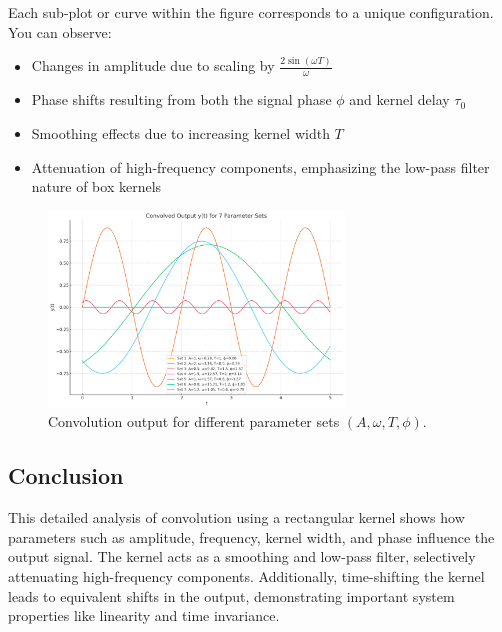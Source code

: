 Each sub-plot or curve within the figure corresponds to a unique configuration. You can observe:
\begin{itemize}
    \item Changes in amplitude due to scaling by \( \frac{2\sin(\omega T)}{\omega} \)
    \item Phase shifts resulting from both the signal phase \( \phi \) and kernel delay \( \tau_0 \)
    \item Smoothing effects due to increasing kernel width \( T \)
    \item Attenuation of high-frequency components, emphasizing the low-pass filter nature of box kernels
\end{itemize}

\begin{figure}[h]
    \centering
    \includegraphics[width=0.7\textwidth]{codes/codes_sin_2/figs/all_varies.png}
    \caption{Convolution output for different parameter sets \( (A, \omega, T, \phi) \).}
\end{figure}


\subsection{Conclusion}

This detailed analysis of convolution using a rectangular kernel shows how parameters such as amplitude, frequency, kernel width, and phase influence the output signal. The kernel acts as a smoothing and low-pass filter, selectively attenuating high-frequency components. Additionally, time-shifting the kernel leads to equivalent shifts in the output, demonstrating important system properties like linearity and time invariance.


